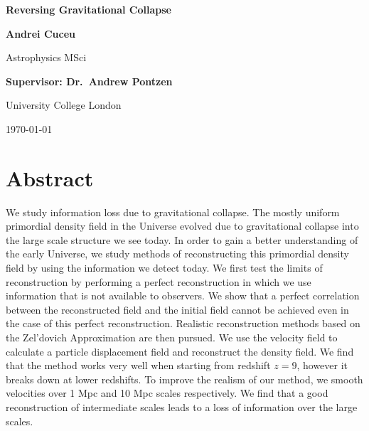 \documentclass[12pt,aas_macros,twoside]{report}
\begin{document}
\begin{titlepage}
    \begin{center}
        
        \vspace*{3cm}
        {\fontsize{40}{60}\selectfont \textbf{Reversing Gravitational Collapse}}
        
        
        \vspace{3cm}
        
        \Huge
        \textbf{Andrei Cuceu}
        
        \huge
        Astrophysics MSci
        
        \vspace{1cm}
        
        \huge
        \textbf{Supervisor: Dr.\ Andrew Pontzen}
        
        \vspace{7cm}
        
        \huge
        University College London
        
        \vspace{0.5cm}
        \huge
        \today
        
    \end{center}
\end{titlepage}



\chapter*{\Huge Abstract}

We study information loss due to gravitational collapse. The mostly uniform primordial density field in the Universe evolved due to gravitational collapse into the large scale structure we see today. In order to gain a better understanding of the early Universe, we study methods of reconstructing this primordial density field by using the information we detect today. We first test the limits of reconstruction by performing a perfect reconstruction in which we use information that is not available to observers. We show that a perfect correlation between the reconstructed field and the initial field cannot be achieved even in the case of this perfect reconstruction. Realistic reconstruction methods based on the Zel'dovich Approximation are then pursued. We use the velocity field to calculate a particle displacement field and reconstruct the density field. We find that the method works very well when starting from redshift $z=9$, however it breaks down at lower redshifts. To improve the realism of our method, we smooth velocities over 1 Mpc and 10 Mpc scales respectively. We find that a good reconstruction of intermediate scales leads to a loss of information over the large scales.
\end{document}
